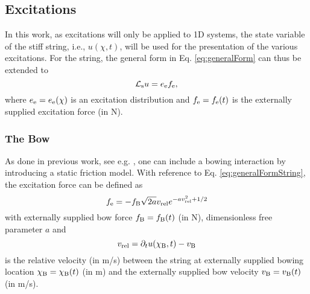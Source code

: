 \documentclass{article}
\begin{document}
  
  
\subsection{Excitations}
In this work, as excitations will only be applied to 1D systems, the state variable of the stiff string, i.e., $u(\chi, t)$, will be used for the presentation of the various excitations. For the string, the general form in Eq. \eqref{eq:generalForm}
can thus be extended to 
\begin{equation}\label{eq:generalFormString}
    \mathcal{L}_{\text{s}} u = e_{\text{e}} f_{\text{e}},
\end{equation}
where $e_{\text{e}} = e_{\text{e}}(\chi)$ is an excitation distribution and $f_{\text{e}} = f_{\text{e}}(t)$ is the externally supplied excitation force (in N).

\subsubsection{The Bow}
As done in previous work, see e.g. \cite{Willemsen2019}, one can include a bowing interaction by introducing a static friction model. With reference to Eq. \eqref{eq:generalFormString}, the excitation force can be defined as \cite{theBible}
\begin{equation}
    f_\text{e} = - f_{\text{B}}\sqrt{2a}v_\text{rel} e^{-av_\text{rel}^2+1/2} 
\end{equation}
with externally supplied bow force $f_{\text{B}} = f_{\text{B}}(t)$ (in N), dimensionless free parameter $a$ and 
\begin{equation}
    v_\text{rel} = \partial_t u(\chi_{\text{B}}, t) - v_{\text{B}}
\end{equation}
is the relative velocity (in m/s) between the string at externally supplied bowing location $\chi_{\text{B}} = \chi_{\text{B}}(t)$ (in m) and the externally supplied bow velocity $v_{\text{B}} = v_{\text{B}}(t)$ (in m/s).
\end{document}
